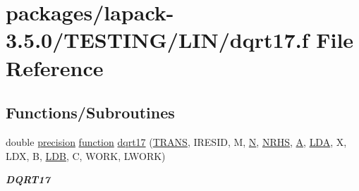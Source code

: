 \hypertarget{dqrt17_8f}{}\section{packages/lapack-\/3.5.0/\+T\+E\+S\+T\+I\+N\+G/\+L\+I\+N/dqrt17.f File Reference}
\label{dqrt17_8f}
\subsection*{Functions/\+Subroutines}
\begin{DoxyCompactItemize}
\item 
double \hyperlink{numinquire_8h_a2c8e616467665d0b2814d4c1589ba74e}{precision} \hyperlink{afunc_8m_a7b5e596df91eadea6c537c0825e894a7}{function} \hyperlink{group__double__lin_gaf3af5d86cf47cd362ae66f0cad11b159}{dqrt17} (\hyperlink{superlu__enum__consts_8h_a0c4e17b2d5cea33f9991ccc6a6678d62a1f61e3015bfe0f0c2c3fda4c5a0cdf58}{T\+R\+A\+N\+S}, I\+R\+E\+S\+I\+D, M, \hyperlink{polmisc_8c_a0240ac851181b84ac374872dc5434ee4}{N}, \hyperlink{example__user_8c_aa0138da002ce2a90360df2f521eb3198}{N\+R\+H\+S}, \hyperlink{classA}{A}, \hyperlink{example__user_8c_ae946da542ce0db94dced19b2ecefd1aa}{L\+D\+A}, X, L\+D\+X, B, \hyperlink{example__user_8c_a50e90a7104df172b5a89a06c47fcca04}{L\+D\+B}, C, W\+O\+R\+K, L\+W\+O\+R\+K)
\begin{DoxyCompactList}\small\item\em {\bfseries D\+Q\+R\+T17} \end{DoxyCompactList}\end{DoxyCompactItemize}
